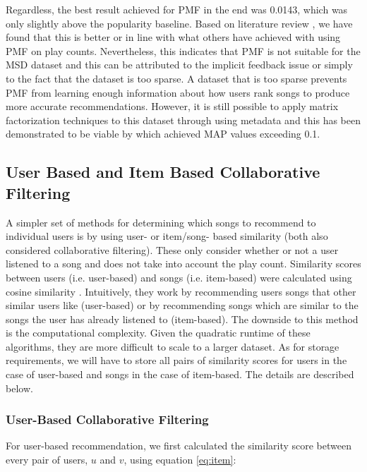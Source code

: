 \documentclass[11pt,preprint]{aastex}
\begin{document}
Regardless, the best result achieved for PMF in the end was 0.0143, which was only slightly above the popularity baseline. Based on literature review \citep{li2012million, McFee:2012:MSD:2187980.2188222}, we have found that this is better or in line with what others have achieved with using PMF on play counts. Nevertheless, this indicates that PMF is not suitable for the MSD dataset and this can be attributed to the implicit feedback issue or simply to the fact that the dataset is too sparse. A dataset that is too sparse prevents PMF from learning enough information about how users rank songs to produce more accurate recommendations. However, it is still possible to apply matrix factorization techniques to this dataset through using metadata and this has been demonstrated to be viable by \citet{liangcodebook} which achieved MAP values exceeding 0.1.  



\subsection{User Based and Item Based Collaborative Filtering}
A simpler set of methods for determining which songs to recommend to individual users is by using user- or item/song- based similarity (both also considered collaborative filtering). These only consider whether or not a user listened to a song and does not take into account the play count. Similarity scores between users (i.e. user-based) and songs (i.e. item-based) were calculated using cosine similarity \citep{aiolli2013preliminary, li2012million}. Intuitively, they work by recommending users songs that other similar users like (user-based) or by recommending songs which are similar to the songs the user has already listened to (item-based). The downside to this method is the computational complexity. Given the quadratic runtime of these algorithms, they are more difficult to scale to a larger dataset. As for storage requirements, we will have to store all pairs of similarity scores for users in the case of user-based and songs in the case of item-based. The details are described below.

\subsubsection{User-Based Collaborative Filtering}
For user-based recommendation, we first calculated the similarity score between every pair of users, $u$ and $v$, using equation \ref{eq:item}:
\end{document}
